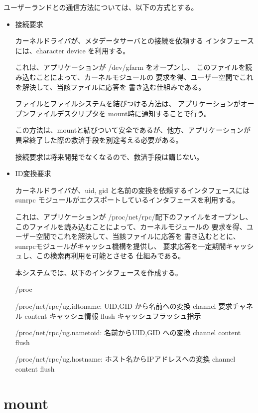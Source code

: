 ユーザーランドとの通信方法については、以下の方式とする。
\begin{itemize}
\item	接続要求	\par
	カーネルドライバが、メタデータサーバとの接続を依頼する
	インタフェースには、character device を利用する。

	これは、アプリケーションが /dev/gfarm をオープンし、
	このファイルを読み込むことによって、カーネルモジュールの
	要求を得、ユーザー空間でこれを解決して、当該ファイルに応答を
	書き込む仕組みである。

	ファイルとファイルシステムを結びつける方法は、
	アプリケーションがオープンファイルデスクリプタを
	mount時に通知することで行う。
	
	この方法は、mountと結びついて安全であるが、他方、アプリケーションが
	異常終了した際の救済手段を別途考える必要がある。

	接続要求は将来開発でなくなるので、救済手段は講じない。

\item	ID変換要求	\par
	カーネルドライバが、uid, gid と名前の変換を依頼するインタフェースには
	sunrpc モジュールがエクスポートしているインタフェースを利用する。

	これは、アプリケーションが /proc/net/rpc/配下のファイルをオープンし、
	このファイルを読み込むことによって、カーネルモジュールの
	要求を得、ユーザー空間でこれを解決して、当該ファイルに応答を
	書き込むととに、sunrpcモジュールがキャッシュ機構を提供し、
	要求応答を一定期間キャッシュし、この検索再利用を可能とさせる
	仕組みである。
	
	本システムでは、以下のインタフェースを作成する。
	\begin{itembox}[l]{/proc}\begin{cprog}
	/proc/net/rpc/ug.idtoname:	UID,GID から名前への変換
			   channel	要求チャネル
			   content	キャッシュ情報
			   flush	キャッシュフラッシュ指示

	/proc/net/rpc/ug.nametoid:	名前からUID,GID への変換
			   channel
			   content
			   flush

	/proc/net/rpc/ug.hostname:	ホスト名からIPアドレスへの変換
			   channel
			   content
			   flush
	\end{cprog}\end{itembox}

\end{itemize}

\section{mount}

